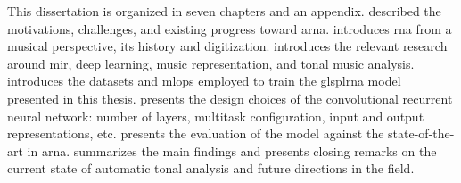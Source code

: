 
This dissertation is organized in seven chapters and an
appendix.  described the motivations,
challenges, and existing progress toward \gls{arna}.
 introduces
\gls{rna} from a musical perspective, its history and
digitization.  introduces the relevant
research around \gls{mir}, deep learning, music
representation, and tonal music analysis.
 introduces the
datasets and \gls{mlops} employed to train the glspl{rna}
model presented in this thesis. 
presents the design choices of the convolutional recurrent
neural network: number of layers, multitask configuration,
input and output representations, etc.
 presents the evaluation of
the model against the state-of-the-art in \gls{arna}.
 summarizes the main findings and
presents closing remarks on the current state of automatic
tonal analysis and future directions in the field.
